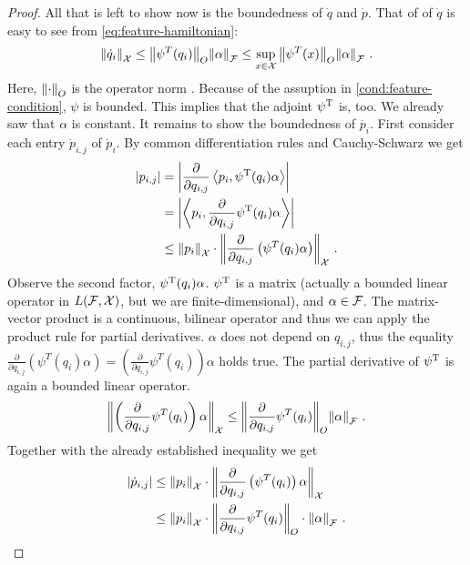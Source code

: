 \begin{proof}
	All that is left to show now is the boundedness of $\dot{q}$ and $\dot{p}$.
	That of of $\dot{q}$ is easy to see from \cref{eq:feature-hamiltonian}:
	\begin{equation}
		\norm{\dot{q}_i}_\cX \leq \norm{\psi^T(q_i)}_O \norm{\alpha}_\cF 
		\leq \sup_{x \in \cX}\norm{\psi^T(x)}_O \norm{\alpha}_\cF\ .
	\end{equation}
	Here, $\norm{\cdot}_O$ is the operator norm \cite{conway07}.
	Because of the assuption in \cref{cond:feature-condition}, $\psi$ is bounded.
	This implies that the adjoint $\psi^{\mathrm{T}}$ is, too.
	We already saw that $\alpha$ is constant.
	It remains to show the boundedness of $\dot{p_i}$.
	First consider each entry $\dot{p}_{i, j}$ of $\dot{p}_i$.
	By common differentiation rules and Cauchy-Schwarz we get
	\begin{align}
		\abs{p_{i,j}} &= \abs{\frac{\partial}{\partial q_{i, j}}\left<p_i, \psi^{\mathrm{T}}(q_i) \alpha \right> }\\
		&= \abs{\left<p_i, \frac{\partial}{\partial q_{i, j}} \psi^{\mathrm{T}}(q_i) \alpha \right> }\\
		&\leq \norm{p_i}_{\mathcal{X}} \cdot \norm{\frac{\partial}{\partial q_{i, j}} \left(\psi^T(q_i) \alpha\right) }_{\mathcal{X}} \ .
	\end{align}
	Observe the second factor, $\psi^{\mathrm{T}}(q_i) \alpha$. $\psi^{\mathrm{T}}$ is a matrix (actually a bounded linear operator in $L(\mathcal{F}, \mathcal{X})$, but we are finite-dimensional), and $\alpha \in \mathcal{F}$.
	The matrix-vector product is a continuous, bilinear operator and thus we can apply the product rule for partial derivatives.
	$\alpha$ does not depend on $q_{i, j}$, thus the equality $\frac{\partial}{\partial q_{i, j}} \left(\psi^T(q_i) \alpha\right) = \left(\frac{\partial}{\partial q_{i, j}} \psi^T(q_i)\right)  \alpha$ holds true. The partial derivative of $\psi^{\mathrm{T}}$ is again a bounded linear operator.
	\begin{equation}
		\norm{\left(\frac{\partial}{\partial q_{i, j}} \psi^T(q_i)\right)  \alpha}_{\mathcal{X}} \leq \norm{\frac{\partial}{\partial q_{i, j}} \psi^T(q_i)}_O \norm{\alpha}_{\mathcal{F}} \ .
	\end{equation}
	Together with the already established inequality we get
	\begin{align}
		\abs{\dot{p}_{i,j}} &\leq \norm{p_i}_{\mathcal{X}} \cdot \norm{\frac{\partial}{\partial q_{i, j}} \left(\psi^T(q_i)\right) \alpha }_{\mathcal{X}}\\
		&\leq  \norm{p_i}_{\mathcal{X}} \cdot \norm{\frac{\partial}{\partial q_{i, j}} \psi^T(q_i)}_O \cdot \norm{\alpha }_{\mathcal{F}} \ .
	\end{align}

\end{proof}
